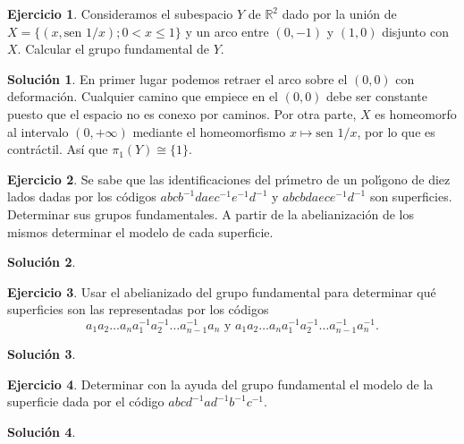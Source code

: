 \documentclass{article}
\theoremstyle{plain}
\theoremstyle{definition}
\newtheorem{exercise}{Ejercicio}
\newtheorem*{sol*}{Solución}
\begin{document}
\newpage

\begin{exercise}

Consideramos el subespacio $Y$ de $\mathbb{R}^2$ dado por la uni\'on de $X=\{(x,\textrm{sen }1/x);0<x\leq 1\}$ y un arco entre $(0,-1)$ y $(1,0)$ disjunto con $X$. Calcular el grupo fundamental de $Y$.

\end{exercise}
\begin{sol*}
En primer lugar podemos retraer el arco sobre el $(0,0)$ con deformación. Cualquier camino que empiece en el $(0,0)$ debe ser constante puesto que el espacio no es conexo por caminos. Por otra parte, $X$ es homeomorfo al intervalo $(0,+\infty)$ mediante el homeomorfismo $x\mapsto\textrm{sen }1/x$, por lo que es contráctil. Así que $\pi_1(Y)\cong\{1\}$.
\end{sol*}

\newpage

\begin{exercise}
Se sabe que las identificaciones del pr\'{\i}metro de  un pol\'{\i}gono de diez lados dadas por los c\'odigos $abcb^{-1}daec^{-1}e^{-1}d^{-1}$ y $abcbdaece^{-1}d^{-1}$ son
superficies. Determinar sus grupos fundamentales. A partir de la abelianizaci\'on de los mismos determinar el modelo de cada superficie.
\end{exercise}
\begin{sol*}
\end{sol*}

\newpage

\begin{exercise}
Usar el abelianizado del grupo fundamental para determinar qu\'e superficies son las representadas por los c\'odigos
$$
a_1a_2\dots a_n a^{-1}_1a^{-1}_2\dots a^{-1}_{n-1}a_n \mbox{ y } a_1a_2\dots a_na^{-1}_1a^{-1}_2\dots a^{-1}_{n-1}a^{-1}_n.
$$
\end{exercise}
\begin{sol*}
\end{sol*}

\newpage

\begin{exercise}
Determinar con la ayuda del grupo fundamental el modelo de la superficie dada por  el c\'odigo $abcd^{-1}ad^{-1}b^{-1}c^{-1}$.
\end{exercise}
\begin{sol*}
\end{sol*}
\end{document}
